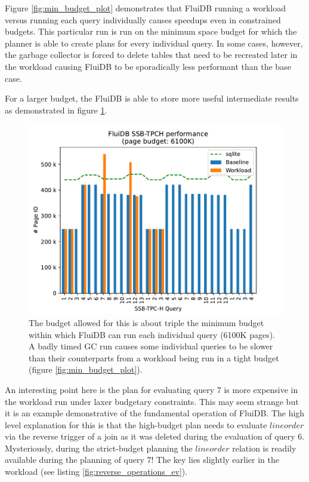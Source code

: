 Figure \ref{fig:min_budget_plot} demonstrates that FluiDB running a
workload versus running each query individually causes speedups even
in constrained budgets. This particular run is run on the minimum
space budget for which the planner is able to create plans for every
individual query. In some cases, however, the garbage collector is
forced to delete tables that need to be recreated later in the
workload causing FluiDB to be sporadically less performant than the
base case.

For a larger budget, the FluiDB is able to store more useful
intermediate results as demonstrated in figure
\ref{fig:large_budget_plot}.

\begin{figure}[H]
  \centering
  \includegraphics[width=.9\linewidth]{./plans/workload_6100K.pdf}
  \caption{\label{fig:large_budget_plot} \ioperfdescr The budget
    allowed for this is about triple the minimum budget within which
    FluiDB can run each individual query (6100K pages). A badly timed GC
    run causes some individual queries to be slower than their
    counterparts from a workload being run in a tight budget (figure
    \ref{fig:min_budget_plot}).}
\end{figure}

An interesting point here is the plan for evaluating query 7 is more
expensive in the workload run under laxer budgetary constraints. This
may seem strange but it is an example demonstrative of the fundamental
operation of FluiDB. The high level explanation for this is that the
high-budget plan needs to evaluate \(\mathit{lineorder}\) via the
reverse trigger of a join as it was deleted during the evaluation of
query 6. Mysteriously, during the strict-budget planning the
\(\mathit{lineorder}\) relation is readily available during the
planning of query 7! The key lies slightly earlier in the workload
(see listing \ref{fig:reverse_operations_ev}).

